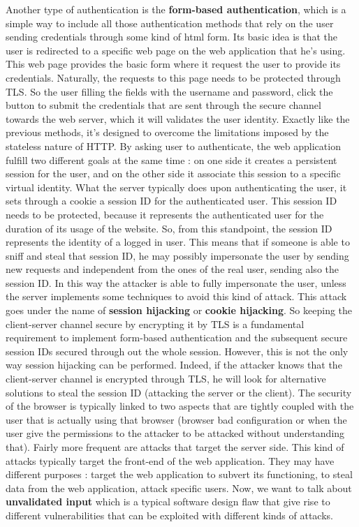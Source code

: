 Another type of authentication is the \textbf{form-based authentication}, which is a simple way to include all those authentication methods that rely on the user sending credentials through some kind of html form. Its basic idea is that the user is redirected to a specific web page on the web application that he's using. This web page provides the basic form where it request the user to provide its credentials. Naturally, the requests to this page needs to be protected through TLS. So the user filling the fields with the username and password, click the button to submit the credentials that are sent through the secure channel towards the web server, which it will validates the user identity. Exactly like the previous methods, it's designed to overcome the limitations imposed by the stateless nature of HTTP. By asking user to authenticate, the web application fulfill two different goals at the same time : on one side it creates a persistent session for the user, and on the other side it associate this session to a specific virtual identity. What the server typically does upon authenticating the user, it sets through a cookie a session ID for the authenticated user. This session ID needs to be protected, because it represents the authenticated user for the duration of its usage of the website. So, from this standpoint, the session ID represents the identity of a logged in user. This means that if someone is able to sniff and steal that session ID, he may possibly impersonate the user by sending new requests and independent from the ones of the real user, sending also the session ID. In this way the attacker is able to fully impersonate the user, unless the server implements some techniques to avoid this kind of attack. This attack goes under the name of \textbf{session hijacking} or \textbf{cookie hijacking}. So keeping the client-server channel secure by encrypting it by TLS is a fundamental requirement to implement form-based authentication and the subsequent secure session IDs secured through out the whole session. However, this is not the only way session hijacking can be performed. Indeed, if the attacker knows that the client-server channel is encrypted through TLS, he will look for alternative solutions to steal the session ID (attacking the server or the client). The security of the browser is typically linked to two aspects that are tightly coupled with the user that is actually using that browser (browser bad configuration or when the user give the permissions to the attacker to be attacked without understanding that). Fairly more frequent are attacks that target the server side. This kind of attacks typically target the front-end of the web application. They may have different purposes : target the web application to subvert its functioning, to steal data from the web application, attack specific users. Now, we want to talk about \textbf{unvalidated input} which is a typical software design flaw that give rise to different vulnerabilities that can be exploited with different kinds of attacks.

